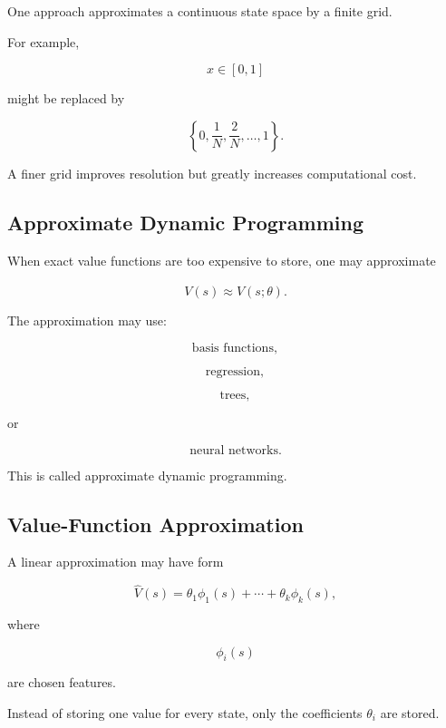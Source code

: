 One approach approximates a continuous state space by a finite grid.

For example,

\[
x\in[0,1]
\]

might be replaced by

\[
\boxed{
\left\{
0,
\frac1N,
\frac2N,
\ldots,
1
\right\}.
}
\]

A finer grid improves resolution but greatly increases computational
cost.

\subsection{Approximate Dynamic Programming}
\label{subsec:approximate-dynamic-programming}

When exact value functions are too expensive to store, one may approximate

\[
\boxed{
V(s)
\approx
\widehat{V}(s;\theta).
}
\]

The approximation may use:

\[
\boxed{
\text{basis functions},
}
\]

\[
\boxed{
\text{regression},
}
\]

\[
\boxed{
\text{trees},
}
\]

or

\[
\boxed{
\text{neural networks}.
}
\]

This is called approximate dynamic programming.

\subsection{Value-Function Approximation}
\label{subsec:value-function-approximation}

A linear approximation may have form

\[
\boxed{
\widehat{V}(s)
=
\theta_1\phi_1(s)
+
\cdots
+
\theta_k\phi_k(s),
}
\]

where

\[
\phi_i(s)
\]

are chosen features.

Instead of storing one value for every state, only the coefficients
\(\theta_i\) are stored.

